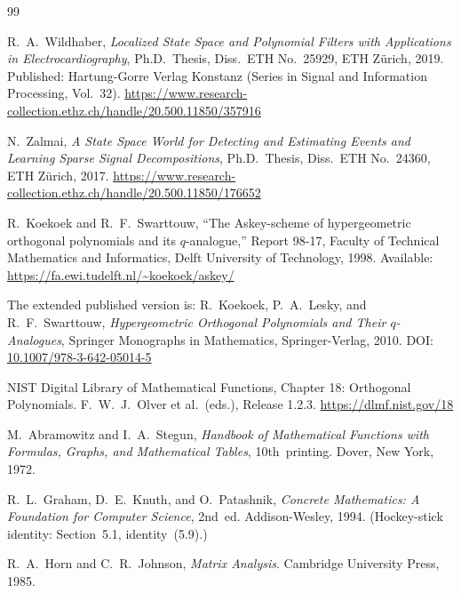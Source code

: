 \documentclass[11pt, a4paper]{article}
\theoremstyle{definition}
\begin{document}
\begingroup
\renewcommand{\section}[2]{}
\begin{thebibliography}{99}

R.\ A.\ Wildhaber,
\emph{Localized State Space and Polynomial Filters with Applications in
Electrocardiography},
Ph.D.\ Thesis, Diss.\ ETH No.\ 25929, ETH Zürich, 2019.
Published: Hartung-Gorre Verlag Konstanz (Series in Signal and Information
Processing, Vol.\ 32).
\url{https://www.research-collection.ethz.ch/handle/20.500.11850/357916}

N.\ Zalmai,
\emph{A State Space World for Detecting and Estimating Events and Learning
Sparse Signal Decompositions},
Ph.D.\ Thesis, Diss.\ ETH No.\ 24360, ETH Zürich, 2017.
\url{https://www.research-collection.ethz.ch/handle/20.500.11850/176652}

R.\ Koekoek and R.\ F.\ Swarttouw,
``The Askey-scheme of hypergeometric orthogonal polynomials and its
$q$-analogue,''
Report 98-17, Faculty of Technical Mathematics and Informatics,
Delft University of Technology, 1998.
Available: \url{https://fa.ewi.tudelft.nl/~koekoek/askey/}

The extended published version is:
R.\ Koekoek, P.\ A.\ Lesky, and R.\ F.\ Swarttouw,
\emph{Hypergeometric Orthogonal Polynomials and Their $q$-Analogues},
Springer Monographs in Mathematics, Springer-Verlag, 2010.
DOI: \href{https://doi.org/10.1007/978-3-642-05014-5}{10.1007/978-3-642-05014-5}

NIST Digital Library of Mathematical Functions,
Chapter 18: Orthogonal Polynomials.
F.\ W.\ J.\ Olver et al.\ (eds.), Release 1.2.3.
\url{https://dlmf.nist.gov/18}

M.\ Abramowitz and I.\ A.\ Stegun,
\emph{Handbook of Mathematical Functions with Formulas, Graphs, and
Mathematical Tables}, 10th~printing.
Dover, New York, 1972.

R.\ L.\ Graham, D.\ E.\ Knuth, and O.\ Patashnik,
\emph{Concrete Mathematics: A Foundation for Computer Science}, 2nd~ed.
Addison-Wesley, 1994.
(Hockey-stick identity: Section~5.1, identity~(5.9).)

R.\ A.\ Horn and C.\ R.\ Johnson,
\emph{Matrix Analysis}.
Cambridge University Press, 1985.

\end{thebibliography}
\endgroup
\end{document}
